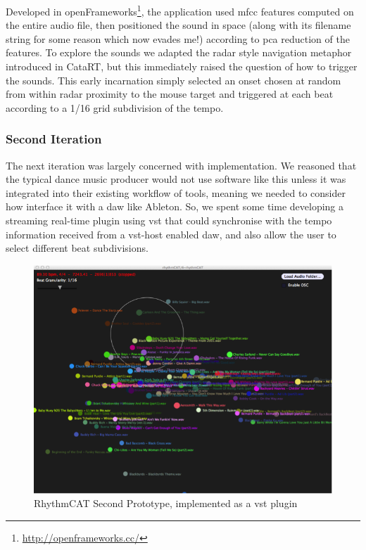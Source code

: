 Developed in openFrameworks\footnote{\url{http://openframeworks.cc/}}, the application used \acrshort{mfcc} features computed on the entire audio file, then positioned the sound in space (along with its filename string for some reason which now evades me!) according to \acrshort{pca} reduction of the features. To explore the sounds we adapted the radar style navigation metaphor introduced in CataRT, but this immediately raised the question of how to trigger the sounds. This early incarnation simply selected an onset chosen at random from within radar proximity to the mouse target and triggered at each beat according to a 1/16 grid subdivision of the tempo.

\subsubsection{Second Iteration}

The next iteration was largely concerned with implementation. We reasoned that the typical dance music producer would not use software like this unless it was integrated into their existing workflow of tools, meaning we needed to consider how interface it with a \acrshort{daw} like Ableton. So, we spent some time developing a streaming real-time plugin using \acrfull{vst} that could synchronise with the tempo information received from a \acrshort{vst}-host enabled \acrshort{daw}, and also allow the user to select different beat subdivisions.

\begin{figure}
	\begin{center}
		\includegraphics[width=1.0\textwidth]{ch06_rhythmcat/figures/rhythmcat_proto2.png}
	\end{center}
	\caption[RhythmCAT First Prototype]{RhythmCAT Second Prototype, implemented as a \acrshort{vst} plugin}
	\label{fig:rhythmcat_proto1}
\end{figure}

